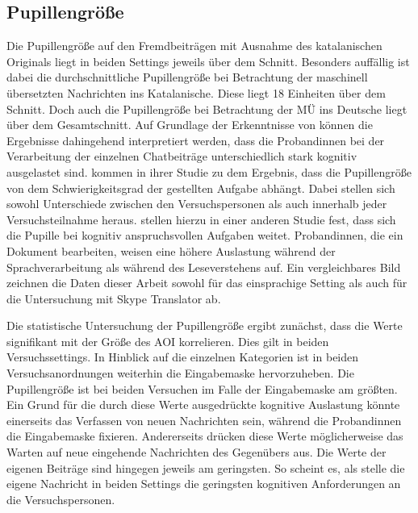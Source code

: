 
\subsection{Pupillengröße}
\label{K7:subsec:pupilsize}


Die Pupillengröße auf den Fremdbeiträgen mit Ausnahme des katalanischen Originals liegt in beiden Settings jeweils über dem Schnitt. Besonders auffällig ist dabei die durchschnittliche Pupillengröße bei Betrachtung der maschinell übersetzten Nachrichten ins Katalanische. Diese liegt 18 Einheiten über dem Schnitt. Doch auch die Pupillengröße bei Betrachtung der MÜ ins Deutsche liegt über dem Gesamtschnitt. Auf Grundlage der Erkenntnisse von \citet[]{hess_pupil_1964, beatty_task-evoked_1982} können die Ergebnisse dahingehend interpretiert werden, dass die Proband{\textperiodcentered}innen bei der Verarbeitung der einzelnen Chatbeiträge unterschiedlich stark kognitiv ausgelastet sind. \citet[17\psq]{krejtz_eye_2018} kommen in ihrer Studie zu dem Ergebnis, dass die Pupillengröße von dem Schwierigkeitsgrad der gestellten Aufgabe abhängt. Dabei stellen sich sowohl Unterschiede zwischen den Versuchspersonen als auch innerhalb jeder Versuchsteilnahme heraus. \citet[317\psq]{iqbal_towards_2005} stellen hierzu in einer anderen Studie fest, dass sich die Pupille bei kognitiv anspruchsvollen Aufgaben weitet. Proband{\textperiodcentered}innen, die ein Dokument bearbeiten, weisen eine höhere Auslastung während der Sprachverarbeitung als während des Leseverstehens auf.
Ein vergleichbares Bild zeichnen die Daten dieser Arbeit sowohl für das einsprachige Setting als auch für die Untersuchung mit Skype Translator ab.   

\begin{sloppypar}
Die statistische Untersuchung der Pupillengröße ergibt zunächst, dass die Werte signifikant mit der Größe des AOI korrelieren. Dies gilt in beiden Versuchssettings. In Hinblick auf die einzelnen Kategorien ist in beiden Versuchsanordnungen weiterhin die Eingabemaske hervorzuheben. Die Pupillengröße ist bei beiden Versuchen im Falle der Eingabemaske am größten. Ein Grund für die durch diese Werte ausgedrückte kognitive Auslastung könnte einerseits das Verfassen von neuen Nachrichten sein, während die Proband{\textperiodcentered}innen die Eingabemaske fixieren. Andererseits drücken diese Werte möglicherweise das Warten auf neue eingehende Nachrichten des Gegenübers aus. Die Werte der eigenen Beiträge sind hingegen jeweils am geringsten. So scheint es, als stelle die eigene Nachricht in beiden Settings die geringsten kognitiven Anforderungen an die Versuchspersonen. 
\end{sloppypar}

